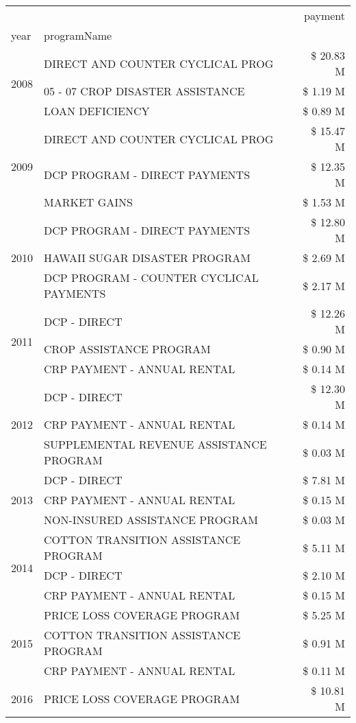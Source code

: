 \begin{tabular}{llr}
\toprule
 &  & payment \\
year & programName &  \\
\midrule
\multirow[t]{3}{*}{2008} & DIRECT AND COUNTER CYCLICAL PROG & \$ 20.83 M \\
 & 05 - 07 CROP DISASTER ASSISTANCE & \$ 1.19 M \\
 & LOAN DEFICIENCY & \$ 0.89 M \\
\cline{1-3}
\multirow[t]{3}{*}{2009} & DIRECT AND COUNTER CYCLICAL PROG & \$ 15.47 M \\
 & DCP PROGRAM - DIRECT PAYMENTS & \$ 12.35 M \\
 & MARKET GAINS & \$ 1.53 M \\
\cline{1-3}
\multirow[t]{3}{*}{2010} & DCP PROGRAM - DIRECT PAYMENTS & \$ 12.80 M \\
 & HAWAII SUGAR DISASTER PROGRAM & \$ 2.69 M \\
 & DCP PROGRAM - COUNTER CYCLICAL PAYMENTS & \$ 2.17 M \\
\cline{1-3}
\multirow[t]{3}{*}{2011} & DCP - DIRECT & \$ 12.26 M \\
 & CROP ASSISTANCE PROGRAM & \$ 0.90 M \\
 & CRP PAYMENT - ANNUAL RENTAL & \$ 0.14 M \\
\cline{1-3}
\multirow[t]{3}{*}{2012} & DCP - DIRECT & \$ 12.30 M \\
 & CRP PAYMENT - ANNUAL RENTAL & \$ 0.14 M \\
 & SUPPLEMENTAL REVENUE ASSISTANCE PROGRAM & \$ 0.03 M \\
\cline{1-3}
\multirow[t]{3}{*}{2013} & DCP - DIRECT & \$ 7.81 M \\
 & CRP PAYMENT - ANNUAL RENTAL & \$ 0.15 M \\
 & NON-INSURED ASSISTANCE PROGRAM & \$ 0.03 M \\
\cline{1-3}
\multirow[t]{3}{*}{2014} & COTTON TRANSITION ASSISTANCE PROGRAM & \$ 5.11 M \\
 & DCP - DIRECT & \$ 2.10 M \\
 & CRP PAYMENT - ANNUAL RENTAL & \$ 0.15 M \\
\cline{1-3}
\multirow[t]{3}{*}{2015} & PRICE LOSS COVERAGE PROGRAM & \$ 5.25 M \\
 & COTTON TRANSITION ASSISTANCE PROGRAM & \$ 0.91 M \\
 & CRP PAYMENT - ANNUAL RENTAL & \$ 0.11 M \\
\cline{1-3}
\multirow[t]{3}{*}{2016} & PRICE LOSS COVERAGE PROGRAM                   & \$ 10.81 M \\

\end{tabular}
